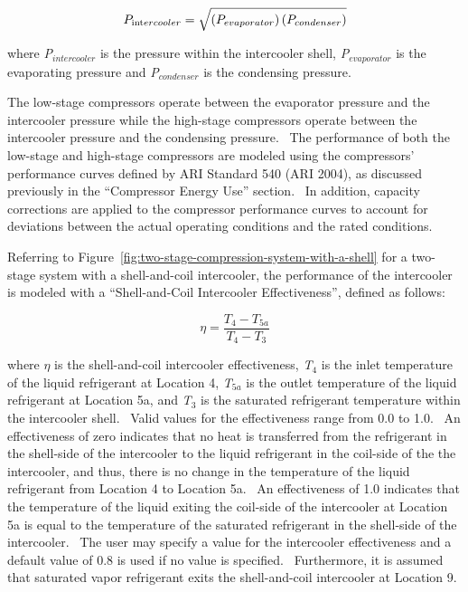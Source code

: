 \begin{equation}
{P_{{\mathop{\rm int}} ercooler}} = \sqrt {\left( {{P_{evaporator}}} \right)\left( {{P_{condenser}}} \right)}
\end{equation}

where \emph{P\(_{intercooler}\)} is the pressure within the intercooler shell, \emph{P\(_{evaporator}\)} is the evaporating pressure and \emph{P\(_{condenser}\)} is the condensing pressure.

The low-stage compressors operate between the evaporator pressure and the intercooler pressure while the high-stage compressors operate between the intercooler pressure and the condensing pressure.~ The performance of both the low-stage and high-stage compressors are modeled using the compressors' performance curves defined by ARI Standard 540 (ARI 2004), as discussed previously in the ``Compressor Energy Use'' section.~ In addition, capacity corrections are applied to the compressor performance curves to account for deviations between the actual operating conditions and the rated conditions.

Referring to Figure~\ref{fig:two-stage-compression-system-with-a-shell} for a two-stage system with a shell-and-coil intercooler, the performance of the intercooler is modeled with a ``Shell-and-Coil Intercooler Effectiveness'', defined as follows:

\begin{equation}
\eta  = \frac{{{T_4} - {T_{5a}}}}{{{T_4} - {T_3}}}
\end{equation}

where \(\eta\) is the shell-and-coil intercooler effectiveness, \emph{T}\(_{4}\) is the inlet temperature of the liquid refrigerant at Location 4, \emph{T}\(_{5a}\) is the outlet temperature of the liquid refrigerant at Location 5a, and \emph{T}\(_{3}\) is the saturated refrigerant temperature within the intercooler shell.~ Valid values for the effectiveness range from 0.0 to 1.0.~ An effectiveness of zero indicates that no heat is transferred from the refrigerant in the shell-side of the intercooler to the liquid refrigerant in the coil-side of the the intercooler, and thus, there is no change in the temperature of the liquid refrigerant from Location 4 to Location 5a.~ An effectiveness of 1.0 indicates that the temperature of the liquid exiting the coil-side of the intercooler at Location 5a is equal to the temperature of the saturated refrigerant in the shell-side of the intercooler.~ The user may specify a value for the intercooler effectiveness and a default value of 0.8 is used if no value is specified.~ Furthermore, it is assumed that saturated vapor refrigerant exits the shell-and-coil intercooler at Location 9.

